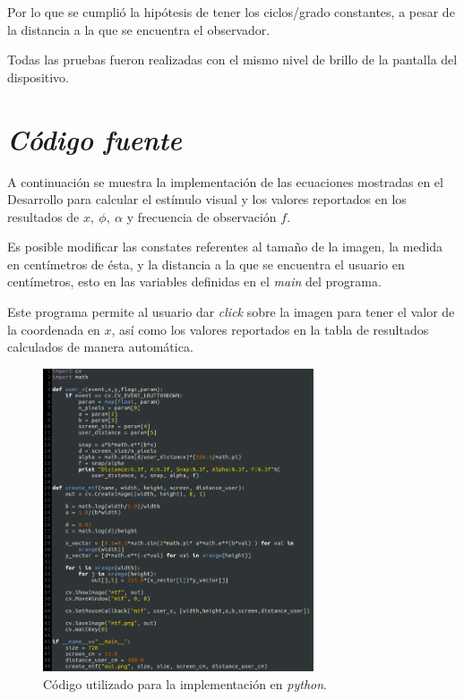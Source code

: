 \documentclass[conference]{IEEEtran}
\begin{document}
Por lo que se cumplió la hipótesis de tener los ciclos/grado constantes, a pesar de la distancia a la que se encuentra el observador.

Todas las pruebas fueron realizadas con el mismo nivel de brillo de la pantalla del dispositivo.

\section{\textit{Código fuente}}

A continuación se muestra la implementación de las ecuaciones mostradas en el Desarrollo para calcular el estímulo visual y los valores reportados en los resultados de $x,\ \phi,\ \alpha$ y frecuencia de observación $f$.

Es posible modificar las constates referentes al tamaño de la imagen, la medida en centímetros de ésta, y la distancia a la que se encuentra el usuario en centímetros, esto en las variables definidas en el \textit{main} del programa.

Este programa permite al usuario dar \textit{click} sobre la imagen para tener el valor de la coordenada en $x$, así como los valores reportados en la tabla de resultados calculados de manera automática.

\begin{figure}[htbp]
\centerline{\includegraphics[width=80mm]{code/code1}}
\caption{Código utilizado para la implementación en \textit{python}.}
\label{code1}
\end{figure}
\end{document}
